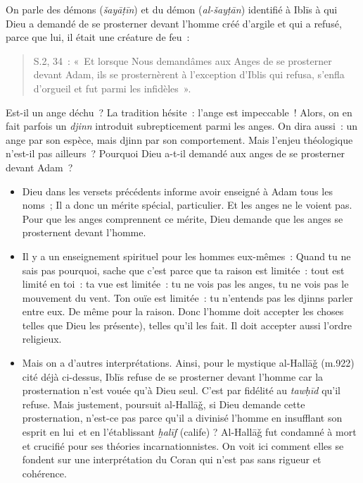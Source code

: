{On parle des démons (\emph{šayāṭīn}) et du démon (\emph{al-šayṭān})
identifié à Iblīs à qui Dieu a demandé de se prosterner devant l'homme
créé d'argile et qui a refusé, parce que lui, il était une créature de
feu~:

\begin{quote}
S.2, 34~: «~Et lorsque Nous demandâmes aux Anges de se prosterner devant
Adam, ils se prosternèrent à l'exception d'Iblis qui refusa, s'enfla
d'orgueil et fut parmi les infidèles~».


\end{quote}
Est-il un ange déchu~? La tradition hésite~: l'ange est impeccable~!
Alors, on en fait parfois un \emph{djinn} introduit subrepticement parmi
les anges. On dira aussi~: un ange par son espèce, mais djinn par son
comportement. Mais l'enjeu théologique n'est-il pas ailleurs~? Pourquoi
Dieu a-t-il demandé aux anges de se prosterner devant Adam~?

\begin{itemize}
\item
  Dieu dans les versets précédents informe avoir enseigné à Adam tous
  les noms~; Il a donc un mérite spécial, particulier. Et les anges ne
  le voient pas. Pour que les anges comprennent ce mérite, Dieu demande
  que les anges se prosternent devant l'homme.
\item
  Il y a un enseignement spirituel pour les hommes eux-mêmes~: Quand tu
  ne sais pas pourquoi, sache que c'est parce que ta raison est
  limitée~: tout est limité en toi~: ta vue est limitée~: tu ne vois pas
  les anges, tu ne vois pas le mouvement du vent. Ton ouïe est limitée~:
  tu n'entends pas les djinns parler entre eux. De même pour la raison.
  Donc l'homme doit accepter les choses telles que Dieu les présente),
  telles qu'il les fait. Il doit accepter aussi l'ordre religieux.
\item
  Mais on a d'autres interprétations. Ainsi, pour le mystique al-Hallāǧ
  (m.922) cité déjà ci-dessus, Iblīs refuse de se prosterner devant
  l'homme car la prosternation n'est vouée qu'à Dieu seul. C'est par
  fidélité au \emph{tawḥīd} qu'il refuse. Mais justement, poursuit
  al-Hallāǧ, si Dieu demande cette prosternation, n'est-ce pas parce
  qu'il a divinisé l'homme en insufflant son esprit en lui~et en
  l'établissant \emph{ḫalīf} (calife) ? Al-Hallāǧ fut condamné à mort et
  crucifié pour ses théories incarnationnistes. On voit ici comment
  elles se fondent sur une interprétation du Coran qui n'est pas sans
  rigueur et cohérence.
\end{itemize}


\label{quels-livres-ruxe9vuxe9luxe9s}}

